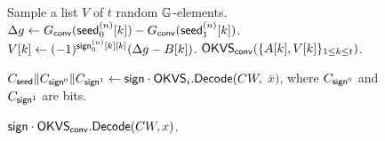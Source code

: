 \begin{figure}
{{\begin{algorithmic}[1]
        \State Sample a list $V$ of $t$ random $\mathbb{G}$-elements. 
          \State $\Delta g\gets G_{\sf conv}({\sf seed}_0^{(n)}[k]) - G_{\sf conv}({\sf seed}_1^{(n)}[k])$. 
          \State$V[k]\gets (-1)^{{\sf sign}_0^{(n)}[k][k]}(\Delta g-B[k])$.
        \EndFor 
        \State \Return ${\sf OKVS}_{\sf conv}(\{A[k], V[k]\}_{1\le k\le t})$. 
      \EndProcedure
      \item[]
        \State\Return $C_{{\sf seed}}\|C_{{\sf sign}^0}\|C_{{\sf sign}^1}\gets{\sf sign}\cdot{\sf OKVS}_i.{\sf Decode}(CW,$ $\bar{x})$, where $C_{{\sf sign}^0}$ and $C_{{\sf sign}^1}$ are bits. \label{alg:okvs_correction}
      \EndProcedure
      \item[]
        \State \Return ${\sf sign}\cdot{\sf OKVS}_{\sf conv}.{\sf Decode}(CW,x)$. \label{alg:okvs_convert_correction}
      \EndProcedure
    \end{algorithmic}}}
  \end{figure}
